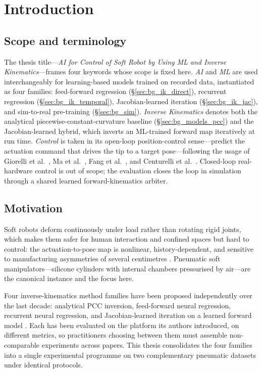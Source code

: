\chapter{Introduction}
\label{chap:introduction}

\section{Scope and terminology}
\label{sec:intro_scope}

The thesis title---\emph{AI for Control of Soft Robot by Using ML and Inverse Kinematics}---frames four keywords whose scope is fixed here. \emph{AI} and \emph{ML} are used interchangeably for learning-based models trained on recorded data, instantiated as four families: feed-forward regression (§\ref{sec:bg_ik_direct}), recurrent regression (§\ref{sec:bg_ik_temporal}), Jacobian-learned iteration (§\ref{sec:bg_ik_jac}), and sim-to-real pre-training (§\ref{sec:bg_sim}). \emph{Inverse Kinematics} denotes both the analytical piecewise-constant-curvature baseline (§\ref{sec:bg_models_pcc}) and the Jacobian-learned hybrid, which inverts an ML-trained forward map iteratively at run time. \emph{Control} is taken in its open-loop position-control sense---predict the actuation command that drives the tip to a target pose---following the usage of Giorelli et al.\ \cite{giorelli2015nn}, Ma et al.\ \cite{ma2022bp}, Fang et al.\ \cite{fang2022jacobian}, and Centurelli et al.\ \cite{centurelli2022closed}. Closed-loop real-hardware control is out of scope; the evaluation closes the loop in simulation through a shared learned forward-kinematics arbiter.

\section{Motivation}
\label{sec:intro_motivation}

Soft robots deform continuously under load rather than rotating rigid joints, which makes them safer for human interaction and confined spaces but hard to control: the actuation-to-pose map is nonlinear, history-dependent, and sensitive to manufacturing asymmetries of several centimetres \cite{manti2016soft}. Pneumatic soft manipulators---silicone cylinders with internal chambers pressurised by air---are the canonical instance and the focus here.

Four inverse-kinematics method families have been proposed independently over the last decade: analytical PCC inversion, feed-forward neural regression, recurrent neural regression, and Jacobian-learned iteration on a learned forward model \cite{webster2010review, giorelli2015nn, thuruthel2019modelbased, fang2022jacobian}. Each has been evaluated on the platform its authors introduced, on different metrics, so practitioners choosing between them must assemble non-comparable experiments across papers. This thesis consolidates the four families into a single experimental programme on two complementary pneumatic datasets under identical protocols.

